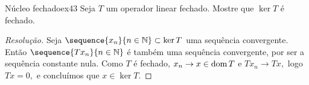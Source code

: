 \begin{exercício}{Núcleo fechado}{ex43}
  Seja \(T\) um operador linear fechado. Mostre que \(\ker{T}\) é fechado.
\end{exercício}
\begin{proof}[Resolução]
  Seja \(\sequence{x_n}{n \in \mathbb{N}} \subset \ker{T}\) uma sequência convergente. Então \(\sequence{Tx_n}{n\in\mathbb{N}}\) é também uma sequência convergente, por ser a sequência constante nula. Como \(T\) é fechado, \(x_n \to x \in \operatorname{dom}{T}\) e \(Tx_n \to Tx,\) logo \(Tx = 0,\) e concluímos que \(x \in \ker{T}.\)
\end{proof}
